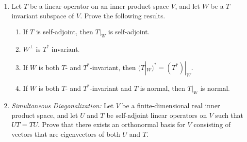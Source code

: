 \documentclass{article}
\begin{document}
\begin{enumerate}
\begin{enumerate}
\item Prove that $T$ is normal if and only if $T_1T_2=T_2T_1$.
\end{enumerate}

\item Let $T$ be a linear operator on an inner product space $V$, and let $W$ be a $T$-invariant subspace of $V$. Prove the following results.
\begin{enumerate}
\item
If $T$ is self-adjoint, then $T|_W$
 is self-adjoint.
\item $W^\perp$
 is $T^*$-invariant.
\item If $W$ is both $T$- and $T^*$-invariant, then $(T|_W)^*
=(T^*)|_W.$
\item
If $W$ is both $T$- and $T^*$-invariant and $T$ is normal, then $T|_W$
 is normal.
\end{enumerate}
\item
{\it Simultaneous Diagonalization:} Let $V$ be a finite-dimensional real inner product space, and let $U$ and $T$ be self-adjoint linear operators on $V$ such that $UT=TU$. Prove that there exists an orthonormal basis for $V$ consisting of vectors that are eigenvectors of both $U$ and $T$.
     \end{enumerate}
     
\end{document}
